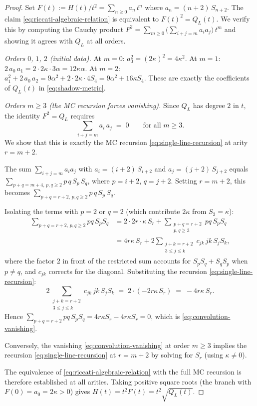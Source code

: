 \begin{proof}
Set $F(t) := H(t)/t^2 = \sum_{n \geq 0} a_n \, t^n$ where
$a_n = (n+2)\, S_{n+2}$.
The claim \eqref{eq:riccati-algebraic-relation} is equivalent to
$F(t)^2 = Q_L(t)$. We verify this by computing the Cauchy
product $F^2 = \sum_{m \geq 0} \bigl(\sum_{i+j=m} a_i a_j\bigr)
\, t^m$ and showing it agrees with $Q_L$ at all orders.

\emph{Orders $0$, $1$, $2$ (initial data).}
At $m = 0$: $a_0^2 = (2\kappa)^2 = 4\kappa^2$.
At $m = 1$: $2\,a_0\,a_1 = 2 \cdot 2\kappa \cdot 3\alpha = 12\kappa\alpha$.
At $m = 2$: $a_1^2 + 2\,a_0\,a_2 = 9\alpha^2 + 2 \cdot 2\kappa \cdot 4S_4
= 9\alpha^2 + 16\kappa S_4$.
These are exactly the coefficients of $Q_L(t)$ in
\eqref{eq:shadow-metric}.

\emph{Orders $m \geq 3$ (the MC recursion forces vanishing).}
Since $Q_L$ has degree $2$ in $t$, the identity $F^2 = Q_L$ requires
\begin{equation}
\label{eq:convolution-vanishing}
 \sum_{i + j = m} a_i \, a_j \;=\; 0
 \qquad \text{for all } m \geq 3.
\end{equation}
We show that this is exactly the MC recursion
\eqref{eq:single-line-recursion} at arity $r = m + 2$.

The sum $\sum_{i+j=m} a_i a_j$ with
$a_i = (i+2)\,S_{i+2}$ and $a_j = (j+2)\,S_{j+2}$
equals $\sum_{p+q = m+4,\, p,q \geq 2} p\,q\,S_p\,S_q$,
where $p = i+2$, $q = j+2$. Setting $r = m+2$, this becomes
$\sum_{p+q = r+2,\, p,q \geq 2} p\,q\,S_p\,S_q$.

Isolating the terms with $p = 2$ or $q = 2$
(which contribute $2\kappa$ from $S_2 = \kappa$):
\begin{align*}
 \sum_{p+q=r+2,\, p,q \geq 2} pq\,S_p S_q
 &= 2 \cdot 2r \cdot \kappa\,S_r
 + \sum_{\substack{p+q=r+2 \\ p,q \geq 3}} pq\,S_p S_q \\
 &= 4r\kappa\,S_r
 + 2\!\!\sum_{\substack{j+k=r+2 \\ 3 \leq j \leq k}}\!\!
 c_{jk}\,jk\,S_j S_k,
\end{align*}
where the factor $2$ in front of the restricted sum accounts for
$S_p S_q + S_q S_p$ when $p \neq q$, and $c_{jk}$ corrects
for the diagonal. Substituting the recursion
\eqref{eq:single-line-recursion}:
\[
 2\!\!\sum_{\substack{j+k=r+2 \\ 3 \leq j \leq k}}\!\!
 c_{jk}\,jk\,S_j S_k
 \;=\;
 2 \cdot (-2r\kappa\,S_r)
 \;=\;
 -4r\kappa\,S_r.
\]
Hence $\sum_{p+q=r+2} pq\,S_p S_q = 4r\kappa S_r - 4r\kappa S_r = 0$,
which is \eqref{eq:convolution-vanishing}.

Conversely, the vanishing \eqref{eq:convolution-vanishing} at
order $m \geq 3$ implies the recursion
\eqref{eq:single-line-recursion} at $r = m+2$ by solving for
$S_r$ (using $\kappa \neq 0$).

The equivalence of \eqref{eq:riccati-algebraic-relation} with
the full MC recursion is therefore established at all arities.
Taking positive square roots (the branch with $F(0) = a_0 = 2\kappa > 0$)
gives $H(t) = t^2 F(t) = t^2 \sqrt{Q_L(t)}$.
\end{proof}

